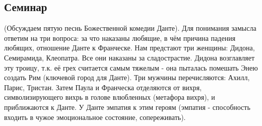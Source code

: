 \subsection{Семинар}
(Обсуждаем пятую песнь Божественной комедии Данте). Для понимания замысла ответим на три вопроса: за что наказаны любящие, в чём причина падения любящих, отношение Данте к Франческе. Нам предстают три женщины: Дидона, Семирамида, Клеопатра. Все они наказаны за сладострастие. Дидона возглавляет эту троицу, т.к. её грех считается самым тяжелым - она пыталась помешать Энею создать Рим (ключевой город для Данте). Три мужчины перечисляются: Ахилл, Парис, Тристан. Затем Паула и Франческа отделяются от вихря, символизирующего вихрь в голове влюбленных (метафора вихря), и приближаются к Данте. У Данте эмпатия к этим героям (эмпатия - способность входить в чужое эмоциональное состояние, сопереживать).

